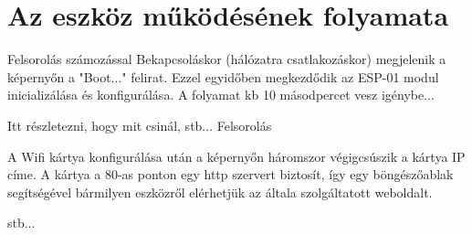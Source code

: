 \documentclass[a4paper, 12pt]{article}
\begin{document}
\section{Az eszköz működésének folyamata}
Felsorolás számozással
Bekapcsoláskor (hálózatra csatlakozáskor) megjelenik a képernyőn a "Boot..." felirat. Ezzel egyidőben megkezdődik az ESP-01 modul inicializálása és konfigurálása.
A folyamat kb 10 másodpercet vesz igénybe...

Itt részletezni, hogy mit csinál, stb...
Felsorolás

A Wifi kártya konfigurálása után a képernyőn háromszor végigcsúszik a kártya IP címe.
A kártya a 80-as ponton egy http szervert biztosít, így egy böngészőablak segítségével bármilyen eszközről elérhetjük az általa szolgáltatott weboldalt.

stb...
\end{document}
